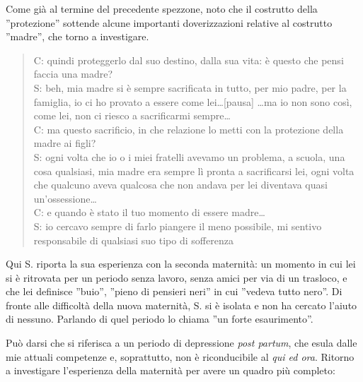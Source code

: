 \noindent Come già al termine del precedente spezzone, noto che il costrutto della ''protezione'' sottende alcune importanti doverizzazioni relative al costrutto ''madre'', che torno a investigare.

\begin{verse}
C: quindi proteggerlo dal suo destino, dalla sua vita: è questo che pensi faccia una madre?\\
S: beh, mia madre si è sempre sacrificata in tutto, per mio padre, per la famiglia, io ci ho provato a essere come lei\ldots{}[pausa] \ldots{}ma io non sono così, come lei, non ci riesco a sacrificarmi sempre\ldots\\
C: ma questo sacrificio, in che relazione lo metti con la protezione della madre ai figli?\\
S: ogni volta che io o i miei fratelli avevamo un problema, a scuola, una cosa qualsiasi, mia madre era sempre lì pronta a sacrificarsi lei, ogni volta che qualcuno aveva qualcosa che non andava per lei diventava quasi un'ossessione\ldots\\
C: e quando è stato il tuo momento di essere madre\ldots\\
S: io cercavo sempre di farlo piangere il meno possibile, mi sentivo responsabile di qualsiasi suo tipo di sofferenza
\end{verse}

\noindent Qui S. riporta la sua esperienza con la seconda maternità: un momento in cui lei si è ritrovata per un periodo senza lavoro, senza amici per via di un trasloco, e che lei definisce ''buio'', ''pieno di pensieri neri'' in cui ''vedeva tutto nero''. Di fronte alle difficoltà della nuova maternità, S. si è isolata e non ha cercato l'aiuto di nessuno. Parlando di quel periodo lo chiama ''un forte esaurimento''. 

Può darsi che si riferisca a un periodo di depressione \emph{post partum}, che esula dalle mie attuali competenze e, soprattutto, non è riconducibile al \emph{qui ed ora}. Ritorno a investigare l'esperienza della maternità per avere un quadro più completo:

